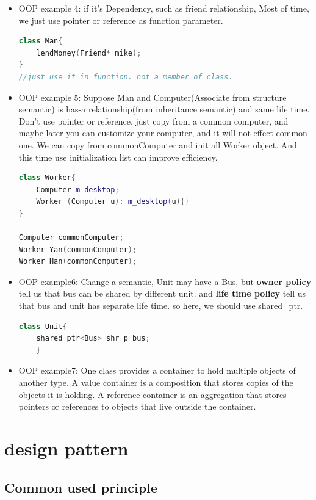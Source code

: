 \documentclass[a4paper,11pt,twoside]{book}
\begin{document}
\begin{itemize}
	\item OOP example 4: if it's Dependency,  such as friend relationship,  Most of time, we just use pointer or reference as function parameter.
\begin{lstlisting}[frame=single, language=c++]
class Man{
	lendMoney(Friend* mike);
}
//just use it in function. not a member of class.
\end{lstlisting}
	
	\item OOP example 5: Suppose Man and Computer(Associate from structure semantic) is has-a relationship(from inheritance semantic) and same life time. Don't use pointer or reference, just copy from a common computer, and maybe later you can customize your computer, and it will not effect common one.  We can copy from commonComputer and init all Worker object.  And this time use initialization list can improve efficiency.
\begin{lstlisting}[frame=single, language=c++]
class Worker{
	Computer m_desktop;
	Worker (Computer u): m_desktop(u){}
}
	
Computer commonComputer;
Worker Yan(commonComputer);
Worker Han(commonComputer);
\end{lstlisting}
	
	
	\item OOP example6:  Change a semantic,  Unit may have a Bus, but \textbf{owner policy} tell us that bus can be shared by different unit. and \textbf{life time policy} tell us that bus and unit has separate life time. so here, we should use shared\_ptr.
	\begin{lstlisting}[frame=single, language=c++]
	class Unit{
	shared_ptr<Bus> shr_p_bus;
	}
	\end{lstlisting}
	
	\item OOP example7: One class provides a container to hold multiple objects of another type. A value container is a composition that stores copies of the objects it is holding. A reference container is an aggregation that stores pointers or references to objects that live outside the container.
	
\end{itemize}




\section{design pattern}

\subsection{Common used principle}
\end{document}
